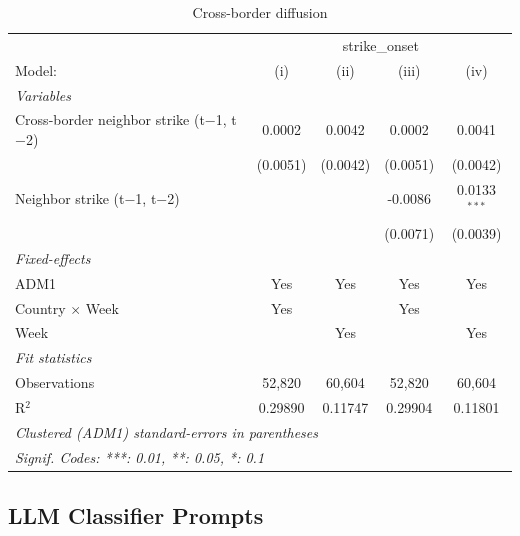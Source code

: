 \documentclass[
  11pt,
]{article}
\begin{document}
\begingroup
\centering
\begin{table}
\caption{Cross-border diffusion}\tabularnewline

\centering
\begin{tabular}{lcccc}
   \hline
    & \multicolumn{4}{c}{strike\_onset}\\
   Model:                                      & (i)      & (ii)     & (iii)    & (iv)\\  
   \midrule
   \emph{Variables}\\
   Cross-border neighbor strike (t$-$1, t$-$2) & 0.0002   & 0.0042   & 0.0002   & 0.0041\\   
                                               & (0.0051) & (0.0042) & (0.0051) & (0.0042)\\   
   Neighbor strike (t$-$1, t$-$2)              &          &          & -0.0086  & 0.0133$^{***}$\\   
                                               &          &          & (0.0071) & (0.0039)\\   
   \midrule
   \emph{Fixed-effects}\\
   ADM1                                        & Yes      & Yes      & Yes      & Yes\\  
   Country $\times$ Week                       & Yes      &          & Yes      & \\  
   Week                                        &          & Yes      &          & Yes\\  
   \midrule
   \emph{Fit statistics}\\
   Observations                                & 52,820   & 60,604   & 52,820   & 60,604\\  
   R$^2$                                       & 0.29890  & 0.11747  & 0.29904  & 0.11801\\  
   \hline
   \multicolumn{5}{l}{\emph{Clustered (ADM1) standard-errors in parentheses}}\\
   \multicolumn{5}{l}{\emph{Signif. Codes: ***: 0.01, **: 0.05, *: 0.1}}\\
\end{tabular}
\end{table}

\par\endgroup

\clearpage

\subsection{LLM Classifier Prompts}\label{llm-classifier-prompts}
\end{document}
